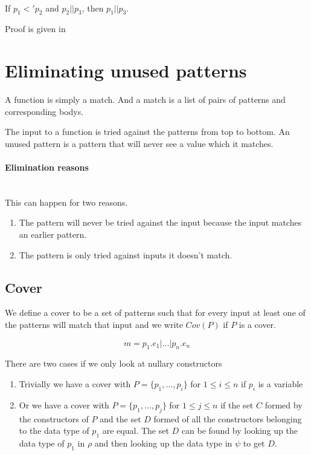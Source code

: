 \begin{lemma}[]\ \\
  \label{lem:more-specific-confused}
  If $p_1 <' p_2$ and $p_2 || p_3$, then $p_1 || p_3$.

  Proof is given in 
\end{lemma}


\section{Eliminating unused patterns}
A function is simply a match. And a match is a list of pairs of patterns and
corresponding bodys.

The input to a function is tried against the patterns from top to bottom. An
unused pattern is a pattern that will never see a value which it matches.

\paragraph{Elimination reasons}\ \\
This can happen for two reasons.
\begin{enumerate}
\item The pattern will never be tried against the input because the input
  matches an earlier pattern. \label{item:unused-reason-1}
\item The pattern is only tried against inputs it doesn't match. \label{item:unused-reason-2}
\end{enumerate}

\subsection{Cover}
\label{sec:cover}

We define a cover to be a set of patterns such that for every input at least one
of the patterns will match that input and we write $Cov(P)$ if $P$ is a cover.

\[
  m = p_1\texttt{.}e_1 \texttt{|} \ldots \texttt{|} p_n\texttt{.}e_n
\]

There are two cases if we only look at nullary constructors
\begin{enumerate}
\item Trivially we have a cover with $P = \{p_1,\ldots,p_i\}$ for $1 \leq i \leq
  n$ if $p_i$ is a variable
  
  
\item Or we have a cover with $P = \{p_1,\ldots,p_j\}$ for $1 \leq j \leq n$ if
  the set $C$ formed by the constructors of $P$ and the set $D$ formed of all
  the constructors belonging to the data type of $p_1$ are equal. The set $D$
  can be found by looking up the data type of $p_1$ in $\rho$ and then looking
  up the data type in $\psi$ to get $D$.

\end{enumerate}

